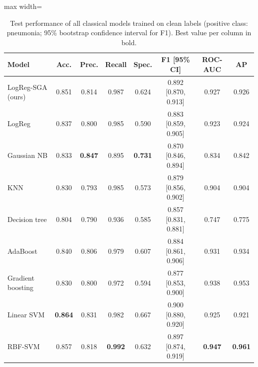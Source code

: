 \begin{table}[t]
\centering
\small
\caption{Test performance of all classical models trained on clean labels (positive class: pneumonia; 95\% bootstrap confidence interval for F1). Best value per column in bold.}
\label{tab:clean}
\begin{adjustbox}{max width=\textwidth}
\begin{tabular}{lccccccc}
\toprule
Model & Acc. & Prec. & Recall & Spec. & F1 [95\% CI] & ROC-AUC & AP \\
\midrule
LogReg-SGA (ours) & 0.851 & 0.814 & 0.987 & 0.624 & 0.892 [0.870, 0.913] & 0.927 & 0.926 \\
LogReg & 0.837 & 0.800 & 0.985 & 0.590 & 0.883 [0.859, 0.905] & 0.923 & 0.924 \\
Gaussian NB & 0.833 & \textbf{0.847} & 0.895 & \textbf{0.731} & 0.870 [0.846, 0.894] & 0.834 & 0.842 \\
KNN & 0.830 & 0.793 & 0.985 & 0.573 & 0.879 [0.856, 0.902] & 0.904 & 0.904 \\
Decision tree & 0.804 & 0.790 & 0.936 & 0.585 & 0.857 [0.831, 0.881] & 0.747 & 0.775 \\
AdaBoost & 0.840 & 0.806 & 0.979 & 0.607 & 0.884 [0.861, 0.906] & 0.931 & 0.934 \\
Gradient boosting & 0.830 & 0.800 & 0.972 & 0.594 & 0.877 [0.853, 0.900] & 0.938 & 0.953 \\
Linear SVM & \textbf{0.864} & 0.831 & 0.982 & 0.667 & 0.900 [0.880, 0.920] & 0.925 & 0.921 \\
RBF-SVM & 0.857 & 0.818 & \textbf{0.992} & 0.632 & 0.897 [0.874, 0.919] & \textbf{0.947} & \textbf{0.961} \\
\bottomrule
\end{tabular}
\end{adjustbox}
\end{table}
